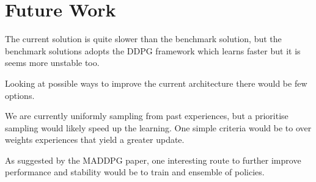 \documentclass[pagenumber=off]{article}
\begin{document}
\section{Future Work}

The current solution is quite slower than the benchmark solution, but the benchmark solutions adopts the DDPG framework which learns faster but it is seems more unstable too. 

Looking at possible ways to improve the current architecture there would be few options.

We are currently uniformly sampling from past experiences, but a prioritise sampling would likely speed up the learning.
One simple criteria would be to over weights experiences that yield a greater update.

As suggested by the MADDPG paper, one interesting route to further improve performance and stability would be to train and ensemble of policies.
\end{document}
